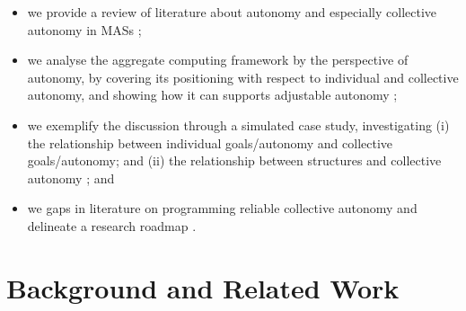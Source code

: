 \begin{itemize}
\item we provide a review of literature about autonomy and especially collective autonomy in MASs ;
\item we analyse the aggregate computing framework by the perspective of autonomy, by covering its positioning with respect to individual and collective autonomy, and showing how it can supports adjustable autonomy ;
\item we exemplify the discussion through a simulated case study, investigating (i) the relationship between individual goals/autonomy
 and collective goals/autonomy;
  and (ii) the relationship between structures and collective autonomy ; and
\item we  gaps in literature on programming reliable collective autonomy 
 and delineate a research roadmap .
\end{itemize}
%
%
%

\section{Background and Related Work}
\label{s:background-rw}

